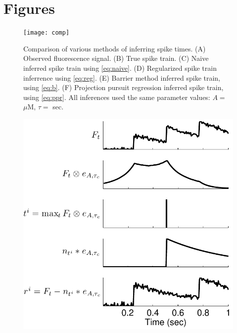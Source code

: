 \documentclass[12pt]{article}
\begin{document}


\section{Figures}

\begin{figure}
\texttt{[image: comp]}
\caption{Comparison of various methods of inferring spike times.  (A) Observed fluorescence signal.  (B) True spike train.  (C) Naive inferred spike train using \eqref{eq:naive}.  (D) Regularized spike train inferrence using \eqref{eq:reg}.  (E) Barrier method inferred spike train, using \eqref{eq:b}. (F) Projection pursuit regression inferred spike train, using \eqref{eq:ppr}.  All inferences used the same parameter values: $A=$ $\mu$M, $\tau=$ sec.} \label{fig:comp}
\end{figure}

\begin{figure} \centering 
\includegraphics[height=0.8\textheight]{ppr_schem} 
\end{figure}


\newpage

%

\end{document}

